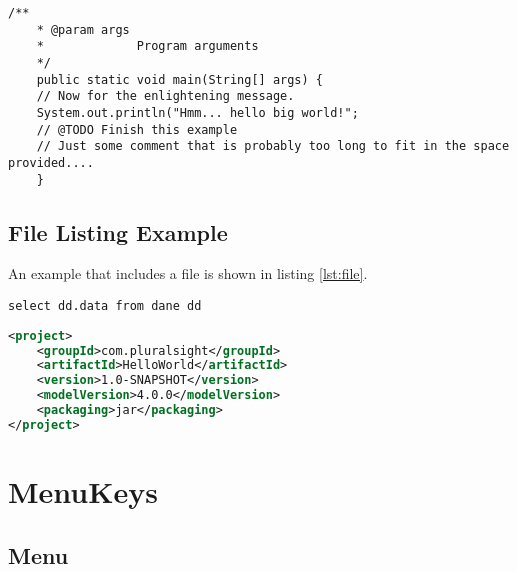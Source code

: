 	\begin{lstlisting}[caption={A simple listing.}, label={lst:simple}]
	/**
	* @param args
	*             Program arguments
	*/
	public static void main(String[] args) {
	// Now for the enlightening message.
	System.out.println("Hmm... hello big world!";
	// @TODO Finish this example
	// Just some comment that is probably too long to fit in the space provided....
	}
	\end{lstlisting}
	
	\subsection*{File Listing Example}
	
	An example that includes a  file is shown in listing \ref{lst:file}.
	
	
	
	
	
	
	
	
	
\begin{lstlisting}[caption={Some Java code},label={lst:label},style=terminal]
select dd.data from dane dd 
\end{lstlisting}
		
\begin{lstlisting}[caption={A simple listing.}, label={lst:simple}, language=XML]
<project>
	<groupId>com.pluralsight</groupId>
	<artifactId>HelloWorld</artifactId>
	<version>1.0-SNAPSHOT</version>
	<modelVersion>4.0.0</modelVersion>
	<packaging>jar</packaging>
</project>
	\end{lstlisting}
\section{MenuKeys}

	\subsection{Menu}

